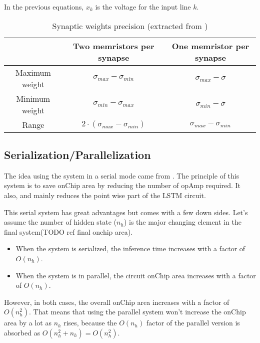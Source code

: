 In the previous equations, $x_k$ is the voltage for the input line $k$.

\begin{table}[H]
  \centering
  \begin{tabular}{|c|c|c|}
    \cline{2-3}
    \rowcolor{gray}
    \multicolumn{1}{c|}{\cellcolor[HTML]{FFFFFF}} & Two memristors per synapse & One memristor per synapse \\
    \hline
    Maximum weight & $\sigma_{max}-\sigma_{min}$ & $\sigma_{max} -\overline{\sigma}$\\
    \hline
    Minimum weight & $\sigma_{min}-\sigma_{max}$ & $\sigma_{min} -\overline{\sigma}$\\
    \hline
    Range & $2\cdot(\sigma_{max}-\sigma_{min})$&$\sigma_{max}-\sigma_{min}$\\
    \hline
  \end{tabular}
  \caption{Synaptic weights precision (extracted from \cite{doubleMem})}
  \label{tab:synapses}
\end{table}

\subsection{Serialization/Parallelization}

The idea using the system in a serial mode came from \cite{thesisRef}. The principle of this system is to save onChip area by reducing the number of \ac{opAmp} required. It also, and mainly reduces the point wise part of the \ac{LSTM} circuit.

This serial system has great advantages but comes with a few down sides. Let's assume the number of hidden state ($n_h$) is the major changing element in the final system(TODO ref final onchip area).

\begin{itemize}
  \item When the system is serialized, the inference time increases with a factor of $O(n_h)$.
  \item When the system is in parallel, the circuit onChip area increases with a factor of $O(n_h)$.
\end{itemize}

However, in both cases, the overall onChip area increases with a factor of $O(n_h^2)$. That means that using the parallel system won't increase the onChip area by a lot as $n_h$ rises, because the $O(n_h)$ factor of the parallel version is absorbed as $O(n_h^2+n_h)=O(n_h^2)$.

